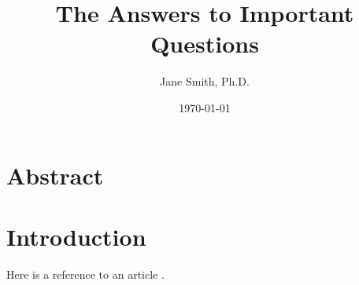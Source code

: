 \documentclass[11pt]{article}
\title{The Answers to Important Questions}
\author{Jane Smith, Ph.D.}
\date{\today}
\begin{document}
\maketitle

\section*{Abstract}

\lipsum[1]

\section*{Introduction}

\lipsum[2]

Here is a reference to an article \citep{mattar:2005aa}.

\lipsum[3]



\end{document}
